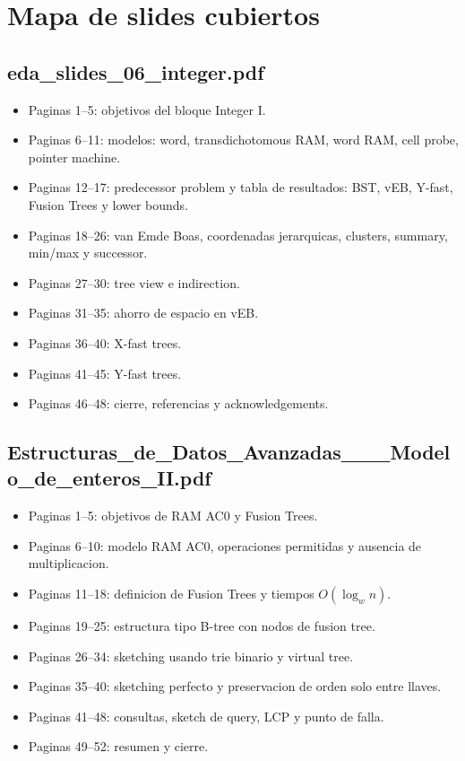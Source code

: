 \documentclass[10pt]{article}
\newcommand{\bigO}{O}
\begin{document}
\newpage
\section{Mapa de slides cubiertos}

\subsection*{eda\_slides\_06\_integer.pdf}
\begin{itemize}[leftmargin=*]
\item Paginas 1--5: objetivos del bloque Integer I.
\item Paginas 6--11: modelos: word, transdichotomous RAM, word RAM, cell probe,
pointer machine.
\item Paginas 12--17: predecessor problem y tabla de resultados: BST, vEB,
Y-fast, Fusion Trees y lower bounds.
\item Paginas 18--26: van Emde Boas, coordenadas jerarquicas, clusters, summary,
min/max y successor.
\item Paginas 27--30: tree view e indirection.
\item Paginas 31--35: ahorro de espacio en vEB.
\item Paginas 36--40: X-fast trees.
\item Paginas 41--45: Y-fast trees.
\item Paginas 46--48: cierre, referencias y acknowledgements.
\end{itemize}

\subsection*{Estructuras\_de\_Datos\_Avanzadas\_\_\_Modelo\_de\_enteros\_II.pdf}
\begin{itemize}[leftmargin=*]
\item Paginas 1--5: objetivos de RAM AC0 y Fusion Trees.
\item Paginas 6--10: modelo RAM AC0, operaciones permitidas y ausencia de
multiplicacion.
\item Paginas 11--18: definicion de Fusion Trees y tiempos
$\bigO(\log_w n)$.
\item Paginas 19--25: estructura tipo B-tree con nodos de fusion tree.
\item Paginas 26--34: sketching usando trie binario y virtual tree.
\item Paginas 35--40: sketching perfecto y preservacion de orden solo entre
llaves.
\item Paginas 41--48: consultas, sketch de query, LCP y punto de falla.
\item Paginas 49--52: resumen y cierre.
\end{itemize}
\end{document}
